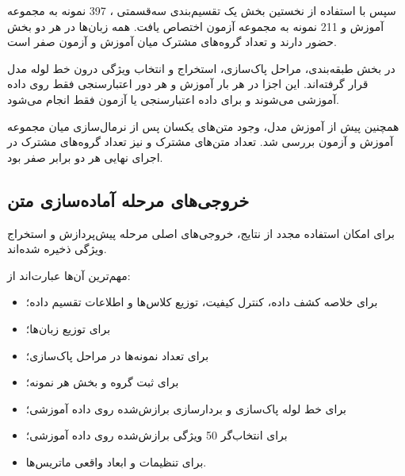 سپس با استفاده از نخستین بخش یک تقسیم‌بندی سه‌قسمتی
،
397 نمونه به مجموعه آموزش و 211 نمونه به مجموعه آزمون اختصاص یافت. همه زبان‌ها در هر دو بخش حضور دارند و تعداد گروه‌های مشترک میان آموزش و آزمون صفر است.

در بخش طبقه‌بندی، مراحل پاک‌سازی، استخراج
و انتخاب ویژگی
درون خط لوله مدل قرار گرفته‌اند. این اجزا در هر بار آموزش و هر دور اعتبارسنجی فقط روی داده آموزشی
می‌شوند و برای داده اعتبارسنجی یا آزمون فقط
انجام می‌شود.

همچنین پیش از آموزش مدل، وجود متن‌های یکسان پس از نرمال‌سازی میان مجموعه آموزش و آزمون بررسی شد. تعداد متن‌های مشترک و نیز تعداد گروه‌های مشترک در اجرای نهایی هر دو برابر صفر بود.


\subsection{خروجی‌های مرحله آماده‌سازی متن}

برای امکان استفاده مجدد از نتایج، خروجی‌های اصلی مرحله پیش‌پردازش و استخراج ویژگی ذخیره شده‌اند.

مهم‌ترین آن‌ها عبارت‌اند از:

\begin{itemize}

	\item {} برای خلاصه کشف داده، کنترل کیفیت، توزیع کلاس‌ها و اطلاعات تقسیم داده؛

	\item {} برای توزیع زبان‌ها؛

	\item {} برای تعداد نمونه‌ها در مراحل پاک‌سازی؛

	\item {} برای ثبت گروه و بخش هر نمونه؛

	\item {} برای خط لوله پاک‌سازی و بردارسازی برازش‌شده روی داده آموزشی؛

	\item {} برای انتخاب‌گر 50 ویژگی برازش‌شده روی داده آموزشی؛

	\item {} برای تنظیمات و ابعاد واقعی ماتریس‌ها.

\end{itemize}

